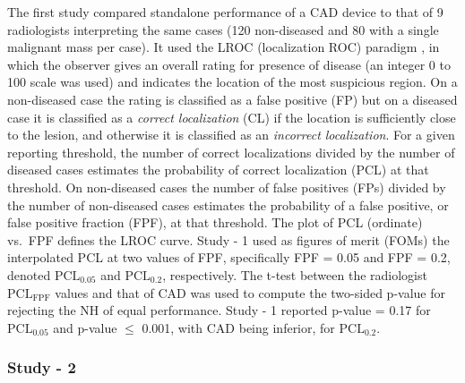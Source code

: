 \documentclass[
]{book}
\begin{document}
The first study \citep{hupse2013standalone} compared standalone performance of a CAD device to that of 9 radiologists interpreting the same cases (120 non-diseased and 80 with a single malignant mass per case). It used the LROC (localization ROC) paradigm \citep{starr1975visual, metz1976observer, swensson1996unified}, in which the observer gives an overall rating for presence of disease (an integer 0 to 100 scale was used) and indicates the location of the most suspicious region. On a non-diseased case the rating is classified as a false positive (FP) but on a diseased case it is classified as a \emph{correct localization} (CL) if the location is sufficiently close to the lesion, and otherwise it is classified as an \emph{incorrect localization}. For a given reporting threshold, the number of correct localizations divided by the number of diseased cases estimates the probability of correct localization (PCL) at that threshold. On non-diseased cases the number of false positives (FPs) divided by the number of non-diseased cases estimates the probability of a false positive, or false positive fraction (FPF), at that threshold. The plot of PCL (ordinate) vs.~FPF defines the LROC curve. Study - 1 used as figures of merit (FOMs) the interpolated PCL at two values of FPF, specifically FPF = 0.05 and FPF = 0.2, denoted \(\text{PCL}_{0.05}\) and \(\text{PCL}_{0.2}\), respectively. The t-test between the radiologist \(\text{PCL}_{\text{FPF}}\) values and that of CAD was used to compute the two-sided p-value for rejecting the NH of equal performance. Study - 1 reported p-value = 0.17 for \(\text{PCL}_{0.05}\) and p-value \(\leq\) 0.001, with CAD being inferior, for \(\text{PCL}_{0.2}\).

\hypertarget{standalone-cad-radiologists-study2}{%
\subsubsection{Study - 2}\label{standalone-cad-radiologists-study2}}
\end{document}
